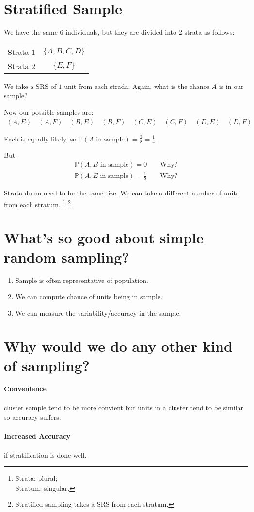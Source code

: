 \documentclass{tufte-handout}
\renewcommand{\P}[0]{\mathbb{P}}
\begin{document}
	\section{Stratified Sample}
	We have the same $6$ individuals, but they are divided into $2$ strata as follows:
	\begin{center}
	\begin{tabular}{lc}
Strata $1$  & $\{A,B,C,D\}$  \\
Strata $2$    & $\{E,F\}$
\end{tabular}
	\end{center}
	We take a SRS of $1$ unit from each strada. Again, what is the chance $A$ is in our sample? 
	
	Now our possible samples are: \begin{align*}
		(A,E)\quad (A,F) \quad (B,E) \quad (B,F) \quad (C,E) \quad (C,F) \quad (D,E) \quad (D,F)
	\end{align*}
	
	Each is equally likely, so $\P(A\text{ in sample}) =\frac{2}{8} = \frac{1}{4}$. 
	
	But, \begin{align*}
		\P(A, B \text{ in sample}) = 0 && \text{ Why?} \\
		\P(A, E \text{ in sample}) = \frac{1}{8} && \text{ Why?} 
	\end{align*}
	
	Strata do no need to be the same size. We can take a different number of units from each stratum. \footnote{Strata: plural;\\ Stratum: singular.}  \footnote{Stratified sampling takes a SRS from each stratum.}
	
	\section{What's so good about simple random sampling?}
	\begin{enumerate}
		\item Sample is often representative of population. 
		\item We can compute chance of units being in sample.
		\item We can measure the variability/accuracy in the sample. 
	\end{enumerate}
	
	\section{Why would we do any other kind of sampling?}
	
	\paragraph{Convenience} cluster sample tend to be more convient but units in a cluster tend to be similar so accuracy suffers. 
	\paragraph{Increased Accuracy} if stratification is done well.
\end{document}
